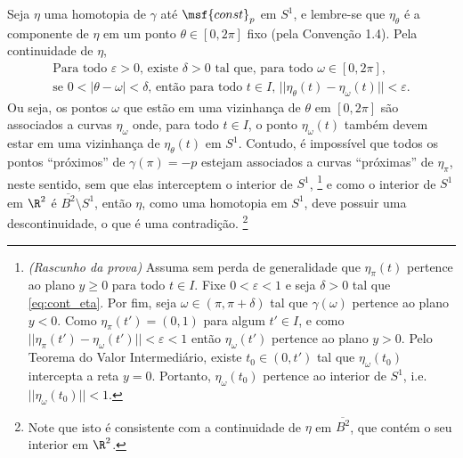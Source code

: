 Seja $\eta$ uma homotopia de $\gamma$ até $\msf{const}_p$ em $S^1$, e lembre-se que $\eta_\theta$ é a componente de $\eta$ em um ponto $\theta \in [0, 2\pi]$ fixo (pela Convenção 1.4). Pela continuidade de $\eta$,%
\linebreak\vspace{-0.6em}
%
\begin{equation}
\begin{gathered}
    \text{Para todo $\varepsilon > 0$, existe $\delta > 0$ tal que, para todo $\omega \in [0, 2\pi]$,}
    \\
    \text{se $0 < |\theta - \omega| < \delta$, então }
    \text{para todo $t \in I$, $||\eta_{\theta}(t) - \eta_{\omega}(t)|| < \varepsilon$.}
\end{gathered}
\label{eq:cont_eta}
\end{equation}
%
Ou seja, os pontos $\omega$ que estão em uma vizinhança de $\theta$ em $[0, 2\pi]$ são associados a curvas $\eta_{\omega}$ onde, para todo $t \in I$, o ponto $\eta_{\omega}(t)$ também devem estar em uma vizinhança de $\eta_{\theta}(t)$ em $S^1$. Contudo, é impossível que todos os pontos ``próximos'' de $\gamma(\pi) = -p$ estejam associados a curvas ``próximas'' de $\eta_\pi$, neste sentido, sem que elas interceptem o interior de $S^1$,%
\footnote
{
    {\it (Rascunho da prova)} Assuma sem perda de generalidade que $\eta_\pi(t)$ pertence ao plano $y \geq 0$ para todo $t \in I$. Fixe $0 < \varepsilon < 1$ e seja $\delta > 0$ tal que \eqref{eq:cont_eta}. Por fim, seja $\omega \in (\pi, \pi + \delta)$ tal que $\gamma(\omega)$ pertence ao plano $y < 0$. Como $\eta_\pi(t') = (0, 1)$ para algum $t' \in I$, e como $||\eta_\pi(t') - \eta_\omega(t')|| < \varepsilon < 1$ então $\eta_\omega(t')$ pertence ao plano $y > 0$. Pelo Teorema do Valor Intermediário, existe $t_0 \in (0, t')$ tal que $\eta_\omega(t_0)$ intercepta a reta $y = 0$. Portanto, $\eta_\omega(t_0)$ pertence ao interior de $S^1$, i.e.\@ $||\eta_\omega(t_0)|| < 1$.
}
e como o interior de $S^1$ em $\R^2$ é $\overline{B^2} \setminus S^1$, então $\eta$, como uma homotopia em $S^1$, deve possuir uma descontinuidade, o que é uma contradição.%
\footnote
{
    Note que isto é consistente com a continuidade de $\eta$ em $\overline{B^2}$, que contém o seu interior em $\R^2$.
}
\linebreak\vspace{-1.2em}

